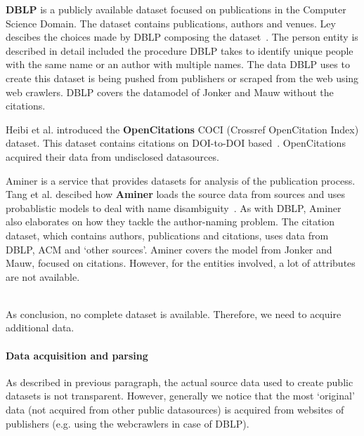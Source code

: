 \documentclass{ou-report}
\newcommand{\todo}[1]{{\color{red} TODO: #1}}
\newcommand{\dblp}{DBLP}
\begin{document}
\textbf{\dblp{}} is a publicly available dataset focused on publications in the
Computer Science Domain. The dataset contains publications, authors and venues.
Ley descibes the choices made by \dblp{} composing the
dataset~\cite{DBLP:journals/pvldb/Ley09}. The person entity is described in 
detail included the procedure DBLP takes to identify unique people with the same
name or an author with multiple names.
The data \dblp{} uses to create this dataset is being pushed from publishers or 
scraped from the web using web crawlers. \dblp{} covers the datamodel of Jonker
and Mauw without the citations.

Heibi et al. introduced the \textbf{OpenCitations} COCI (Crossref OpenCitation 
Index) dataset. This dataset contains citations on DOI-to-DOI
based~\cite{DBLP:journals/scientometrics/HeibiPS19}.
OpenCitations acquired their data from undisclosed datasources.

Aminer is a service that provides datasets for analysis of the publication
process.
Tang et al. descibed how \textbf{Aminer} loads the source data from sources and 
uses probablistic models to deal with name disambiguity~\cite{Tang:08KDD}. As 
with DBLP, Aminer also elaborates on how they tackle the author-naming problem.
The citation dataset, which contains authors, publications and citations, uses
data from DBLP, ACM and `other sources'. 
Aminer covers the model from Jonker and Mauw, focused on citations. However,
for the entities involved, a lot of attributes are not available.

\ \\
As conclusion, no complete dataset is available. Therefore, we need to acquire 
additional data.


\paragraph{Data acquisition and parsing}
As described in previous paragraph, the actual source data used to create public datasets
is not transparent. However, generally we notice that the most `original' 
data (not acquired from other public datasources) is acquired from websites of 
publishers (e.g. using the webcrawlers in case of \dblp{}). 
\end{document}
